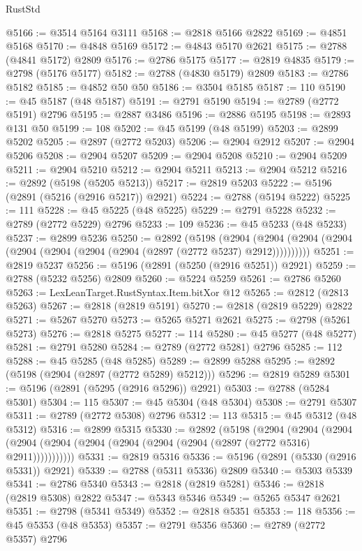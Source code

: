 \begin{lexlean}{RustStd}
\begin{coremodule}
@5166 := @3514 @5164 @3111
@5168 := @2818 @5166 @2822
@5169 := @4851 @5168
@5170 := @4848 @5169
@5172 := @4843 @5170 @2621
@5175 := @2788 (@4841 @5172) @2809
@5176 := @2786 @5175
@5177 := @2819 @4835
@5179 := @2798 (@5176 @5177)
@5182 := @2788 (@4830 @5179) @2809
@5183 := @2786 @5182
@5185 := @4852 @50 @50
@5186 := @3504 @5185
@5187 := 110
@5190 := @45 @5187 (@48 @5187)
@5191 := @2791 @5190
@5194 := @2789 (@2772 @5191) @2796
@5195 := @2887 @3486
@5196 := @2886 @5195
@5198 := @2893 @131 @50
@5199 := 108
@5202 := @45 @5199 (@48 @5199)
@5203 := @2899 @5202
@5205 := @2897 (@2772 @5203)
@5206 := @2904 @2912
@5207 := @2904 @5206
@5208 := @2904 @5207
@5209 := @2904 @5208
@5210 := @2904 @5209
@5211 := @2904 @5210
@5212 := @2904 @5211
@5213 := @2904 @5212
@5216 := @2892 (@5198 (@5205 @5213))
@5217 := @2819 @5203
@5222 := @5196 (@2891 (@5216 (@2916 @5217)) @2921)
@5224 := @2788 (@5194 @5222)
@5225 := 111
@5228 := @45 @5225 (@48 @5225)
@5229 := @2791 @5228
@5232 := @2789 (@2772 @5229) @2796
@5233 := 109
@5236 := @45 @5233 (@48 @5233)
@5237 := @2899 @5236
@5250 := @2892
    (@5198
      (@2904 (@2904 (@2904 (@2904 (@2904 (@2904 (@2904 (@2904 (@2897 (@2772 @5237) @2912))))))))))
@5251 := @2819 @5237
@5256 := @5196 (@2891 (@5250 (@2916 @5251)) @2921)
@5259 := @2788 (@5232 @5256) @2809
@5260 := @5224 @5259
@5261 := @2786 @5260
@5263 := LexLeanTarget.RustSyntax.Item.bitXor @12
@5265 := @2812 (@2813 @5263)
@5267 := @2818 (@2819 @5191)
@5270 := @2818 (@2819 @5229) @2822
@5271 := @5267 @5270
@5273 := @5265 @5271 @2621
@5275 := @2798 (@5261 @5273)
@5276 := @2818 @5275
@5277 := 114
@5280 := @45 @5277 (@48 @5277)
@5281 := @2791 @5280
@5284 := @2789 (@2772 @5281) @2796
@5285 := 112
@5288 := @45 @5285 (@48 @5285)
@5289 := @2899 @5288
@5295 := @2892 (@5198 (@2904 (@2897 (@2772 @5289) @5212)))
@5296 := @2819 @5289
@5301 := @5196 (@2891 (@5295 (@2916 @5296)) @2921)
@5303 := @2788 (@5284 @5301)
@5304 := 115
@5307 := @45 @5304 (@48 @5304)
@5308 := @2791 @5307
@5311 := @2789 (@2772 @5308) @2796
@5312 := 113
@5315 := @45 @5312 (@48 @5312)
@5316 := @2899 @5315
@5330 := @2892
    (@5198
      (@2904
        (@2904
          (@2904 (@2904 (@2904 (@2904 (@2904 (@2904 (@2904 (@2897 (@2772 @5316) @2911)))))))))))
@5331 := @2819 @5316
@5336 := @5196 (@2891 (@5330 (@2916 @5331)) @2921)
@5339 := @2788 (@5311 @5336) @2809
@5340 := @5303 @5339
@5341 := @2786 @5340
@5343 := @2818 (@2819 @5281)
@5346 := @2818 (@2819 @5308) @2822
@5347 := @5343 @5346
@5349 := @5265 @5347 @2621
@5351 := @2798 (@5341 @5349)
@5352 := @2818 @5351
@5353 := 118
@5356 := @45 @5353 (@48 @5353)
@5357 := @2791 @5356
@5360 := @2789 (@2772 @5357) @2796

\end{coremodule}
\end{lexlean}
